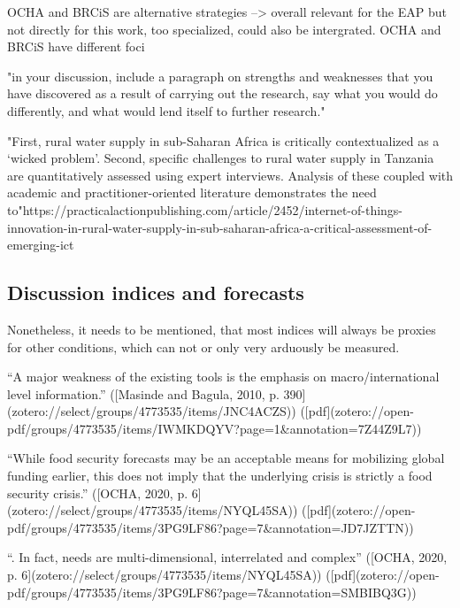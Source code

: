 OCHA and BRCiS are alternative strategies --> overall relevant for the EAP but not directly for this work, too specialized, could also be intergrated. OCHA and BRCiS have different foci

"in your discussion, include a paragraph on strengths and weaknesses that you have discovered as a result of carrying out the research, say what you would do differently, and what would lend itself to further research."



"First, rural water supply in sub-Saharan Africa is critically contextualized as a ‘wicked problem’. Second, specific challenges to rural water supply in Tanzania are quantitatively assessed using expert interviews. Analysis of these coupled with academic and practitioner-oriented literature demonstrates the need to"https://practicalactionpublishing.com/article/2452/internet-of-things-innovation-in-rural-water-supply-in-sub-saharan-africa-a-critical-assessment-of-emerging-ict


\subsection{Discussion indices and forecasts}

Nonetheless, it needs to be mentioned, that most indices will always be proxies for other conditions, which can not or only very arduously be measured. 

“A major weakness of the existing tools is the emphasis on macro/international level information.” ([Masinde and Bagula, 2010, p. 390](zotero://select/groups/4773535/items/JNC4ACZS)) ([pdf](zotero://open-pdf/groups/4773535/items/IWMKDQYV?page=1&annotation=7Z44Z9L7))

“While food security forecasts may be an acceptable means for mobilizing global funding earlier, this does not imply that the underlying crisis is strictly a food security crisis.” ([OCHA, 2020, p. 6](zotero://select/groups/4773535/items/NYQL45SA)) ([pdf](zotero://open-pdf/groups/4773535/items/3PG9LF86?page=7&annotation=JD7JZTTN))

“. In fact, needs are multi-dimensional, interrelated and complex” ([OCHA, 2020, p. 6](zotero://select/groups/4773535/items/NYQL45SA)) ([pdf](zotero://open-pdf/groups/4773535/items/3PG9LF86?page=7&annotation=SMBIBQ3G))

